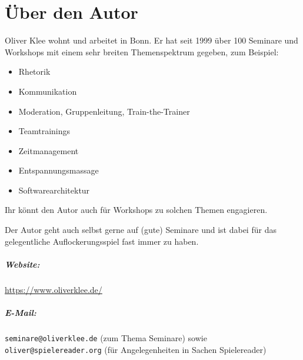 \chapter{Über den Autor}
Oliver Klee wohnt und arbeitet in Bonn. Er hat seit 1999 über 100 Seminare und Workshops mit einem sehr breiten Themenspektrum gegeben, zum Beispiel:
\begin{itemize}
  \item Rhetorik
  \item Kommunikation
  \item Moderation, Gruppenleitung, Train-the-Trainer
  \item Teamtrainings
  \item Zeitmanagement
  \item Entspannungsmassage
  \item Softwarearchitektur
\end{itemize}

Ihr könnt den Autor auch für Workshops zu solchen Themen engagieren.

Der Autor geht auch selbst gerne auf (gute) Seminare und ist dabei für das gelegentliche Auflockerungsspiel fast immer zu haben.

\paragraph{Website:} \url{https://www.oliverklee.de/}
\paragraph{E-Mail:} \texttt{seminare@oliverklee.de} (zum Thema Seminare) sowie \texttt{oliver@spielereader.org} (für Angelegenheiten in Sachen Spielereader)
